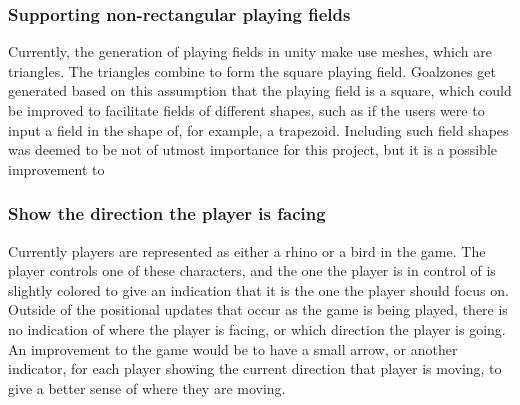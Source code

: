 \subsubsection{Supporting non-rectangular playing fields}
Currently, the generation of playing fields in unity make use meshes, which are triangles.
The triangles combine to form the square playing field.
Goalzones get generated based on this assumption that the playing field is a square, which could be improved to facilitate fields of different shapes, such as if the users were to input a field in the shape of, for example, a trapezoid.
Including such field shapes was deemed to be not of utmost importance for this project, but it is a possible improvement to 

\subsubsection{Show the direction the player is facing}
Currently players are represented as either a rhino or a bird in the game.
The player controls one of these characters, and the one the player is in control of is slightly colored to give an indication that it is the one the player should focus on.
Outside of the positional updates that occur as the game is being played, there is no indication of where the player is facing, or which direction the player is going.
An improvement to the game would be to have a small arrow, or another indicator, for each player showing the current direction that player is moving, to give a better sense of where they are moving.
